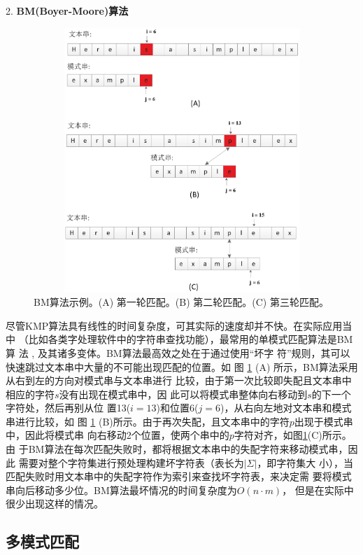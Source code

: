 2. \textbf{BM(Boyer-Moore)算法}

\begin{figure}[H]
  \centering
  \includegraphics[height=10cm ,width=12cm]{figures/1_Introduction/BM.eps}
  \caption{BM算法示例。(A) 第一轮匹配。(B) 第二轮匹配。(C) 第三轮匹配。}
  \label{fig:BM}
\end{figure}

尽管KMP算法具有线性的时间复杂度，可其实际的速度却并不快。在实际应用当中
（比如各类字处理软件中的字符串查找功能），最常用的单模式匹配算法是BM算
法 \cite{Boyer1977}, 及其诸多变体。BM算法最高效之处在于通过使用“坏字
符”规则，其可以快速跳过文本串中大量的不可能出现匹配的位置。如
图 \ref{fig:BM} (A) 所示，BM算法采用从右到左的方向对模式串与文本串进行
比较，由于第一次比较即失配且文本串中相应的字符$s$没有出现在模式串中，因
此可以将模式串整体向右移动到$s$的下一个字符处，然后再别从位
置13($i=13$)和位置6($j=6$)，从右向左地对文本串和模式串进行比较，如
图 \ref{fig:BM}
(B)所示。由于再次失配，且文本串中的字符$p$出现于模式串中，因此将模式串
向右移动2个位置，使两个串中的$p$字符对齐，如图\ref{fig:BM}(C)所示。由
于BM算法在每次匹配失败时，都将根据文本串中的失配字符来移动模式串，因此
需要对整个字符集进行预处理构建坏字符表（表长为$|\Sigma|$，即字符集大
小），当匹配失败时用文本串中的失配字符作为索引来查找坏字符表，来决定需
要将模式串向后移动多少位。BM算法最坏情况的时间复杂度为$O(n \cdot m)$，
但是在实际中很少出现这样的情况。

\subsection{多模式匹配}

